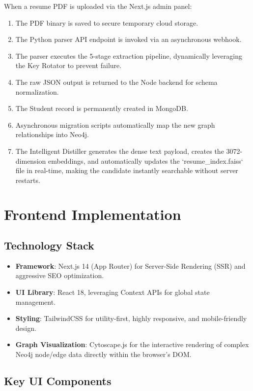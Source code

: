 \documentclass[12pt,a4paper]{report}
\begin{document}
When a resume PDF is uploaded via the Next.js admin panel:
\begin{enumerate}
    \item The PDF binary is saved to secure temporary cloud storage.
    \item The Python parser API endpoint is invoked via an asynchronous webhook.
    \item The parser executes the 5-stage extraction pipeline, dynamically leveraging the Key Rotator to prevent failure.
    \item The raw JSON output is returned to the Node backend for schema normalization.
    \item The Student record is permanently created in MongoDB.
    \item Asynchronous migration scripts automatically map the new graph relationships into Neo4j.
    \item The Intelligent Distiller generates the dense text payload, creates the 3072-dimension embeddings, and automatically updates the `resume\_index.faiss` file in real-time, making the candidate instantly searchable without server restarts.
\end{enumerate}

\section{Frontend Implementation}

\subsection{Technology Stack}
\begin{itemize}
    \item \textbf{Framework}: Next.js 14 (App Router) for Server-Side Rendering (SSR) and aggressive SEO optimization.
    \item \textbf{UI Library}: React 18, leveraging Context APIs for global state management.
    \item \textbf{Styling}: TailwindCSS for utility-first, highly responsive, and mobile-friendly design.
    \item \textbf{Graph Visualization}: Cytoscape.js for the interactive rendering of complex Neo4j node/edge data directly within the browser's DOM.
\end{itemize}

\subsection{Key UI Components}
\end{document}
